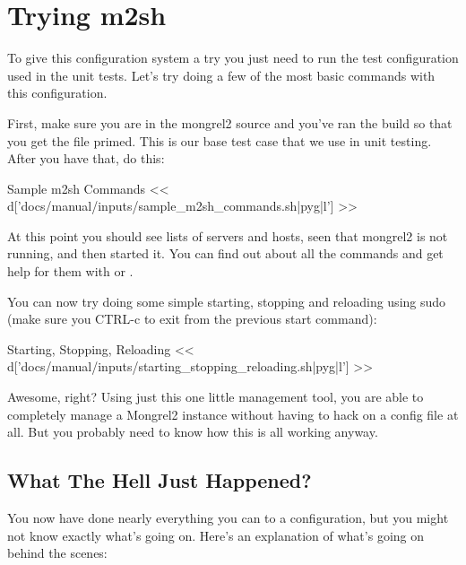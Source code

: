 \section{Trying m2sh}

To give this configuration system a try you just need to run the test configuration used
in the unit tests.  Let's try doing a few of the most basic commands with this configuration.

First, make sure you are in the mongrel2 source and you've ran the build so that you get the
 file primed.  This is our base test case that we use in unit testing.
After you have that, do this:

\begin{code}{Sample m2sh Commands}
<< d['docs/manual/inputs/sample_m2sh_commands.sh|pyg|l'] >>
\end{code}

At this point you should see lists of servers and hosts, seen that mongrel2 is
not running, and then started it.  You can find out about all the commands and
get help for them with  or .

You can now try doing some simple starting, stopping and reloading using sudo (make sure you CTRL-c
to exit from the previous start command):

\begin{code}{Starting, Stopping, Reloading}
<< d['docs/manual/inputs/starting_stopping_reloading.sh|pyg|l'] >>
\end{code}

Awesome, right?  Using just this one little management tool, you
are able to completely manage a Mongrel2 instance without having to hack
on a config file at all.  But you probably need to know how this is all
working anyway.


\subsection{What The Hell Just Happened?}

You now have done nearly everything you can to a configuration, but you might not know exactly
what's going on.  Here's an explanation of what's going on behind the scenes:

